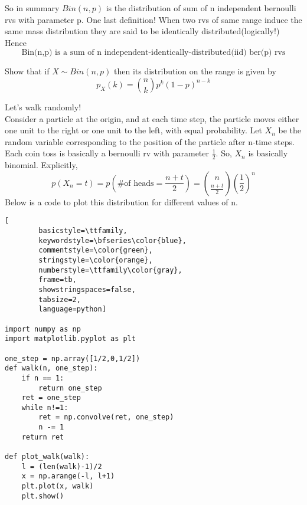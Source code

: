 \documentclass{myclass}
\begin{document}
So in summary $Bin(n,p)$ is the distribution of sum of n independent bernoulli rvs with parameter p.
One last definition! When two rvs of same range induce the same mass distribution they are said to be identically distributed(logically!)
Hence $$\boxed{\text{Bin(n,p) is a sum of n independent-identically-distributed(iid) ber(p) rvs}}$$
\begin{exe}
    Show that if $X\sim Bin(n,p)$ then its distribution on the range is given by $$p_X(k)=\binom{n}{k}p^k(1-p)^{n-k}$$
\end{exe}
\begin{example}
    Let's walk randomly!\\
    Consider a particle at the origin, and at each time step, the particle moves either one unit to the right or one unit to the left, with equal probability. Let $X_n$ be the random variable corresponding to the position of the particle after n-time steps.
    Each coin toss is basically a bernoulli rv with parameter $\frac{1}{2}$. So, $X_n$ is basically binomial. Explicitly,
    $$p(X_n=t)=p\left(\text{\# of heads}=\frac{n+t}{2}\right)=\binom{n}{\frac{n+t}{2}}\left(\frac{1}{2}\right)^n$$
    Below is a code to plot this distribution for different values of n.
\begin{lstlisting}[
        basicstyle=\ttfamily,
        keywordstyle=\bfseries\color{blue},
        commentstyle=\color{green},
        stringstyle=\color{orange},
        numberstyle=\ttfamily\color{gray},
        frame=tb,
        showstringspaces=false,
        tabsize=2,
        language=python]

import numpy as np
import matplotlib.pyplot as plt

one_step = np.array([1/2,0,1/2])
def walk(n, one_step):
    if n == 1:
        return one_step
    ret = one_step
    while n!=1:
        ret = np.convolve(ret, one_step)
        n -= 1
    return ret

def plot_walk(walk):
    l = (len(walk)-1)/2
    x = np.arange(-l, l+1)
    plt.plot(x, walk)
    plt.show()


\end{lstlisting}
\end{example}
\end{document}
